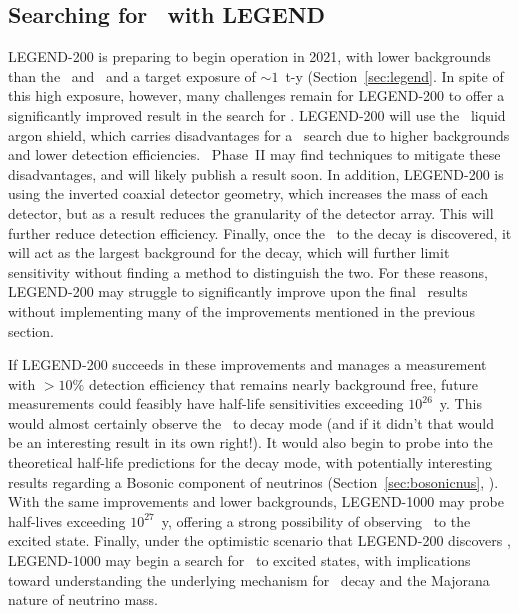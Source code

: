 \documentclass[/main.tex]{subfiles}
\begin{document}
\subsection{Searching for \bbes\ with LEGEND}
LEGEND-200 is preparing to begin operation in 2021, with lower backgrounds than the \MJD\ and \Gerda\ and a target exposure of $\sim1$~t-y (Section~\ref{sec:legend}.
In spite of this high exposure, however, many challenges remain for LEGEND-200 to offer a significantly improved result in the search for \bbes.
LEGEND-200 will use the \Gerda\ liquid argon shield, which carries disadvantages for a \bbes\ search due to higher backgrounds and lower detection efficiencies.
\Gerda\ Phase~II may find techniques to mitigate these disadvantages, and will likely publish a result soon.
In addition, LEGEND-200 is using the inverted coaxial detector geometry, which increases the mass of each detector, but as a result reduces the granularity of the detector array.
This will further reduce detection efficiency.
Finally, once the \bbes\ to the  decay is discovered, it will act as the largest background for the  decay, which will further limit sensitivity without finding a method to distinguish the two.
For these reasons, LEGEND-200 may struggle to significantly improve upon the final \MJD\ results without implementing many of the improvements mentioned in the previous section.

If LEGEND-200 succeeds in these improvements and manages a measurement with $>10\%$ detection efficiency that remains nearly background free, future measurements could feasibly have half-life sensitivities exceeding $10^{26}$~y.
This would almost certainly observe the \bbes\ to  decay mode (and if it didn't that would be an interesting result in its own right!).
It would also begin to probe into the theoretical half-life predictions for the  decay mode, with potentially interesting results regarding a Bosonic component of neutrinos (Section~\ref{sec:bosonicnus}, \cite{Tornow2010}).
With the same improvements and lower backgrounds, LEGEND-1000 may probe half-lives exceeding $10^{27}$~y, offering a strong possibility of observing \tnbb\ to the  excited state.
Finally, under the optimistic scenario that LEGEND-200 discovers \znbb, LEGEND-1000 may begin a search for \znbb\ to excited states, with implications toward understanding the underlying mechanism for \znbb\ decay and the Majorana nature of neutrino mass.

\onlyinsubfile{
  
  
}
\end{document}
